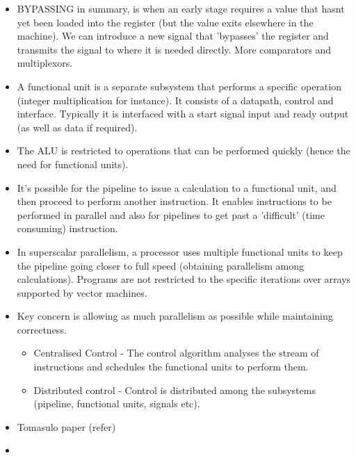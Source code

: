 \documentclass{article}
\begin{document}
\begin{itemize}
\begin{enumerate}
\end{enumerate}
\item BYPASSING in summary, is when an early stage requires a value that hasnt yet been loaded into the register (but the value exits elsewhere in the machine). We can introduce a new signal that 'bypasses' the register and transmits the signal to where it is needed directly. More comparators and multiplexors.
\item A functional unit is a separate subsystem that performs a specific operation (integer multiplication for instance). It consists of a datapath, control and interface. Typically it is interfaced with a start signal input and ready output (as well as data if required).
\item The ALU is restricted to operations that can be performed quickly (hence the need for functional units).
\item It's possible for the pipeline to issue a calculation to a functional unit, and then proceed to perform another instruction. It enables instructions to be performed in parallel and also for pipelines to get past a 'difficult' (time consuming) instruction.
\item In superscalar parallelism, a processor uses multiple functional units to keep the pipeline going closer to full speed (obtaining parallelism among calculations). Programs are not restricted to the specific iterations over arrays supported by vector machines.
\item Key concern is allowing as much parallelism as possible while maintaining correctness.
\begin{itemize}
\item Centralised Control - The control algorithm analyses the stream of instructions and schedules the functional units to perform them.
\item Distributed control - Control is distributed among the subsystems (pipeline, functional units, signals etc). 
\end{itemize}
\item Tomasulo paper (refer)
\item 
\end{itemize}
\end{document}
